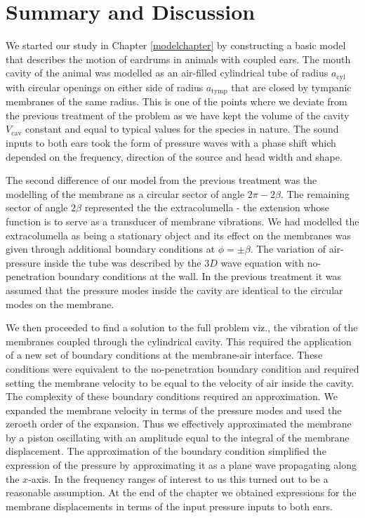 \chapter{Summary and Discussion}
We started our study in Chapter \ref{modelchapter} by constructing a basic model that describes the motion of eardrums in animals
with coupled ears. The mouth cavity of the animal was modelled as an air-filled cylindrical tube
of radius $a_{\mathrm{\mathrm{cyl}}}$ with circular openings on either side of radius $a_{\mathrm{tymp}}$ that are closed by
tympanic membranes of the same radius. This is one of the points where we deviate from the previous treatment
of the problem \cite{vossenjasa} as we have kept the volume of the cavity $V_{\mathrm{cav}}$ constant and equal to
typical values for the species in nature. The sound inputs to both ears took the form of pressure waves
with a phase shift which depended on the frequency, direction of the source and head width and shape.

The second difference of our model from the previous treatment was the modelling of the membrane
as a circular sector of angle $2\pi-2\beta$. The remaining sector of angle $2\beta$ represented the 
the extracolumella - the extension whose function is to serve as a transducer of
membrane vibrations. We had modelled the extracolumella as being a stationary object and its
effect on the membranes was given through additional boundary conditions at $\phi=\pm\beta$. The variation of air-pressure
inside the tube was described by the $3D$ wave equation with no-penetration boundary conditions at the wall. In the previous
treatment it was assumed that the pressure modes inside the cavity are identical to the circular modes on the membrane. 

We then proceeded to find a solution to the full problem viz., the vibration of the membranes coupled through the cylindrical
cavity. This required the application of a new set of boundary conditions at the membrane-air interface. These conditions were
equivalent to the no-penetration boundary condition and required setting the membrane velocity to be equal to the velocity of
air inside the cavity. The complexity of these boundary conditions required an approximation. We expanded the membrane 
velocity in terms of the pressure modes and used the zeroeth order of the expansion. Thus we effectively approximated the membrane
by a piston oscillating with an amplitude equal to the integral of the membrane displacement. The approximation of the boundary
condition simplified the expression of the pressure by approximating it as a plane wave propagating along the $x$-axis. In the
frequency ranges of interest to us this turned out to be a reasonable assumption. At the end of the chapter we obtained expressions
for the membrane displacements in terms of the input pressure inputs to both ears.

